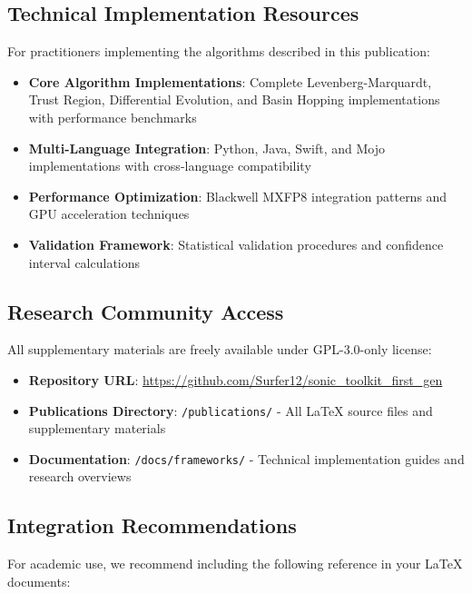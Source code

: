 \documentclass[11pt,a4paper]{article}
\begin{document}
\subsection{Technical Implementation Resources}

For practitioners implementing the algorithms described in this publication:
\begin{itemize}
\item \textbf{Core Algorithm Implementations}: Complete Levenberg-Marquardt, Trust Region, Differential Evolution, and Basin Hopping implementations with performance benchmarks
\item \textbf{Multi-Language Integration}: Python, Java, Swift, and Mojo implementations with cross-language compatibility
\item \textbf{Performance Optimization}: Blackwell MXFP8 integration patterns and GPU acceleration techniques
\item \textbf{Validation Framework}: Statistical validation procedures and confidence interval calculations
\end{itemize}

\subsection{Research Community Access}

All supplementary materials are freely available under GPL-3.0-only license:
\begin{itemize}
\item \textbf{Repository URL}: \url{https://github.com/Surfer12/sonic_toolkit_first_gen}
\item \textbf{Publications Directory}: \texttt{/publications/} - All LaTeX source files and supplementary materials
\item \textbf{Documentation}: \texttt{/docs/frameworks/} - Technical implementation guides and research overviews
\end{itemize}

\subsection{Integration Recommendations}

For academic use, we recommend including the following reference in your LaTeX documents:
\end{document}
